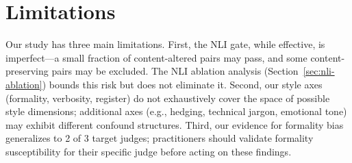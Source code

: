 \documentclass[11pt,a4paper]{article}
\begin{document}
\section*{Limitations}

Our study has three main limitations. First, the NLI gate, while effective, is imperfect---a small fraction of content-altered pairs may pass, and some content-preserving pairs may be excluded. The NLI ablation analysis (Section~\ref{sec:nli-ablation}) bounds this risk but does not eliminate it. Second, our style axes (formality, verbosity, register) do not exhaustively cover the space of possible style dimensions; additional axes (e.g., hedging, technical jargon, emotional tone) may exhibit different confound structures. Third, our evidence for formality bias generalizes to 2 of 3 target judges; practitioners should validate formality susceptibility for their specific judge before acting on these findings.
\end{document}
